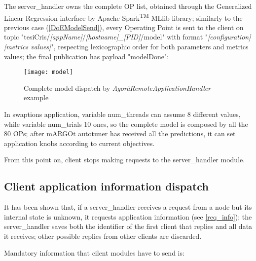 The server\_handler owns the complete OP list, obtained through the Generalized Linear Regression interface by Apache Spark\textsuperscript{TM} MLlib library; similarly to the previous case (\ref{DoEModelSend}), every Operating Point is sent to the client on topic "tesiCris\slash{}\textit{[app\-Name]}\slash{}\textit{[host\-name]\_[PID]}\slash{}model" with format "\textit{[configuration] [metrics values]}", respecting lexicographic order for both parameters and metrics values; the final publication has payload "modelDone":

\begin{figure}[H]

    \centering
    \texttt{[image: model]}
    \caption{Complete model dispatch by \textit{AgoràRemoteApplicationHandler} example}
    \label{fig:model}
    
\end{figure}

In swaptions application, variable num\_threads can assume 8 different values, while variable num\_trials 10 ones, so the complete model is composed by all the 80 OPs; after mARGOt autotuner has received all the predictions, it can set application knobs according to current objectives.

From this point on, client stops making requests to the ser\-ver\_han\-dler module.





\subsection{Client application information dispatch}\label{client_info}

It has been shown that, if a server\_handler receives a request from a node but its internal state is unknown, it requests application information (see \ref{req_info}); the server\_handler saves both the identifier of the first client that replies and all data it receives; other possible replies from other clients are discarded.

Mandatory information that cilent modules have to send is:

